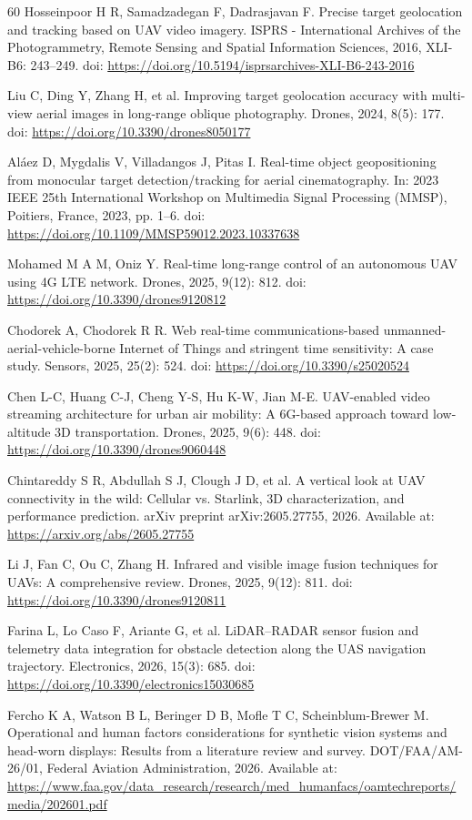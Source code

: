 \documentclass[fleqn]{VRIH2025}
\begin{document}
\begin{thebibliography}{60}
Hosseinpoor H R, Samadzadegan F, Dadrasjavan F. Precise target geolocation and tracking based on UAV video imagery. ISPRS - International Archives of the Photogrammetry, Remote Sensing and Spatial Information Sciences, 2016, XLI-B6: 243--249. doi: \url{https://doi.org/10.5194/isprsarchives-XLI-B6-243-2016}

Liu C, Ding Y, Zhang H, et al. Improving target geolocation accuracy with multi-view aerial images in long-range oblique photography. Drones, 2024, 8(5): 177. doi: \url{https://doi.org/10.3390/drones8050177}

Al\'aez D, Mygdalis V, Villadangos J, Pitas I. Real-time object geopositioning from monocular target detection/tracking for aerial cinematography. In: 2023 IEEE 25th International Workshop on Multimedia Signal Processing (MMSP), Poitiers, France, 2023, pp. 1--6. doi: \url{https://doi.org/10.1109/MMSP59012.2023.10337638}

Mohamed M A M, Oniz Y. Real-time long-range control of an autonomous UAV using 4G LTE network. Drones, 2025, 9(12): 812. doi: \url{https://doi.org/10.3390/drones9120812}

Chodorek A, Chodorek R R. Web real-time communications-based unmanned-aerial-vehicle-borne Internet of Things and stringent time sensitivity: A case study. Sensors, 2025, 25(2): 524. doi: \url{https://doi.org/10.3390/s25020524}

Chen L-C, Huang C-J, Cheng Y-S, Hu K-W, Jian M-E. UAV-enabled video streaming architecture for urban air mobility: A 6G-based approach toward low-altitude 3D transportation. Drones, 2025, 9(6): 448. doi: \url{https://doi.org/10.3390/drones9060448}

Chintareddy S R, Abdullah S J, Clough J D, et al. A vertical look at UAV connectivity in the wild: Cellular vs. Starlink, 3D characterization, and performance prediction. arXiv preprint arXiv:2605.27755, 2026. Available at: \url{https://arxiv.org/abs/2605.27755}

Li J, Fan C, Ou C, Zhang H. Infrared and visible image fusion techniques for UAVs: A comprehensive review. Drones, 2025, 9(12): 811. doi: \url{https://doi.org/10.3390/drones9120811}

Farina L, Lo Caso F, Ariante G, et al. LiDAR--RADAR sensor fusion and telemetry data integration for obstacle detection along the UAS navigation trajectory. Electronics, 2026, 15(3): 685. doi: \url{https://doi.org/10.3390/electronics15030685}

Fercho K A, Watson B L, Beringer D B, Mofle T C, Scheinblum-Brewer M. Operational and human factors considerations for synthetic vision systems and head-worn displays: Results from a literature review and survey. DOT/FAA/AM-26/01, Federal Aviation Administration, 2026. Available at: \url{https://www.faa.gov/data_research/research/med_humanfacs/oamtechreports/media/202601.pdf}

\end{thebibliography}
\end{document}
